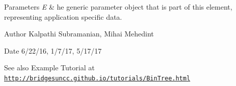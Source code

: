 \begin{DoxyParams}{Parameters}
{\em E} & he generic parameter object that is part of this element, representing application specific data.\\
\hline
\end{DoxyParams}
\begin{DoxyAuthor}{Author}
Kalpathi Subramanian, Mihai Mehedint
\end{DoxyAuthor}
\begin{DoxyDate}{Date}
6/22/16, 1/7/17, 5/17/17
\end{DoxyDate}
\begin{DoxySeeAlso}{See also}
Example Tutorial at \href{http://bridgesuncc.github.io/tutorials/BinTree.html}{\tt http\+://bridgesuncc.\+github.\+io/tutorials/\+Bin\+Tree.\+html} 
\end{DoxySeeAlso}
